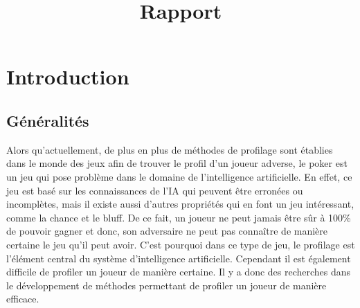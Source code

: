 \documentclass{report}
\title{Rapport}
\author{}
\date{}
\begin{document}


\newpage
\tableofcontents %
\newpage

\chapter{Introduction}
\section{Généralités}
\hspace{0.5cm}Alors qu'actuellement, de plus en plus de méthodes de profilage sont établies dans le monde des jeux afin de trouver le profil d'un joueur adverse, le poker est un jeu qui pose problème dans le domaine de l'intelligence artificielle. En effet, ce jeu est basé sur les connaissances de l'IA qui peuvent être erronées ou incomplètes, mais il existe aussi d'autres propriétés qui en font un jeu intéressant, comme la chance et le bluff. De ce fait, un joueur ne peut jamais être sûr à 100\% de pouvoir gagner et donc, son adversaire ne peut pas connaître de manière certaine le jeu qu'il peut avoir. C'est pourquoi dans ce type de jeu, le profilage est l'élément central du système d'intelligence artificielle. Cependant il est également difficile de profiler un joueur de manière certaine. Il y a donc des recherches dans le développement de méthodes permettant de profiler un joueur de manière efficace.\par
\end{document}
